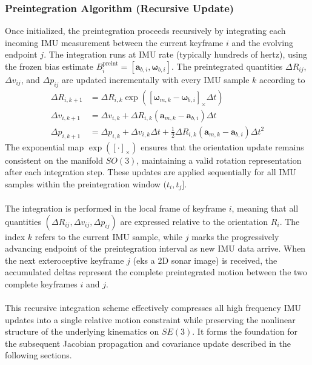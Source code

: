 \subsubsection{Preintegration Algorithm (Recursive Update)}
Once initialized, the preintegration proceeds recursively by integrating each incoming IMU measurement between the current keyframe $i$ and the evolving endpoint $j$. The integration runs at IMU rate (typically hundreds of hertz), using the frozen bias estimate $B_i^{\text{preint}} = [\mathbf{a}_{b,i}, \boldsymbol{\omega}_{b,i}]$. The preintegrated quantities $\Delta R_{ij}$, $\Delta v_{ij}$, and $\Delta p_{ij}$ are updated incrementally with every IMU sample $k$ according to
\begin{equation}
    \begin{aligned}
        \Delta R_{i,k+1} &= \Delta R_{i,k} \exp([\boldsymbol{\omega}_{m,k} - \boldsymbol{\omega}_{b,i}]_\times \Delta t) \\
        \Delta v_{i,k+1} &= \Delta v_{i,k} + \Delta R_{i,k}(\mathbf{a}_{m,k} - \mathbf{a}_{b,i})\Delta t \\
        \Delta p_{i,k+1} &= \Delta p_{i,k} + \Delta v_{i,k}\Delta t + \tfrac{1}{2}\Delta R_{i,k}(\mathbf{a}_{m,k} - \mathbf{a}_{b,i})\Delta t^2
    \end{aligned}
    \label{eq:preintegration-nominal-update}
\end{equation}
The exponential map $\exp([\cdot]_\times)$ ensures that the orientation update remains consistent on the manifold $SO(3)$, maintaining a valid rotation representation after each integration step. These updates are applied sequentially for all IMU samples within the preintegration window $(t_i, t_j]$.
\\ \\
The integration is performed in the local frame of keyframe $i$, meaning that all quantities $(\Delta R_{ij}, \Delta v_{ij}, \Delta p_{ij})$ are expressed relative to the orientation $R_i$. The index $k$ refers to the current IMU sample, while $j$ marks the progressively advancing endpoint of the preintegration interval as new IMU data arrive. When the next exteroceptive keyframe $j$ (eks a 2D sonar image) is received, the accumulated deltas represent the complete preintegrated motion between the two complete keyframes $i$ and $j$.
\\ \\
This recursive integration scheme effectively compresses all high frequency IMU updates into a single relative motion constraint while preserving the nonlinear structure of the underlying kinematics on $SE(3)$. It forms the foundation for the subsequent Jacobian propagation and covariance update described in the following sections.




